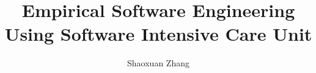 \documentclass[11pt,final,thesis,actual]{uhthesis2e}
\begin{document}
\title{Empirical Software Engineering Using Software Intensive Care Unit}
\author{Shaoxuan Zhang}

\maketitle

\begin{frontmatter}

\signaturepage

\copyrightpage







\tableofcontents

\listoftables

\listoffigures

\end{frontmatter}
\end{document}
